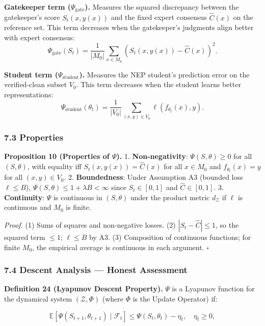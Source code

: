 \documentclass[
  12pt,
]{ctexart}
\begin{document}
\textbf{Gatekeeper term (\(\Psi_{\text{gate}}\)).} Measures the squared
discrepancy between the gatekeeper's score \(S_t(x, y(x))\) and the
fixed expert consensus \(\hat{C}(x)\) on the reference set. This term
decreases when the gatekeeper's judgments align better with expert
consensus:
\[\Psi_{\text{gate}}(S_t) = \frac{1}{|M_0|} \sum_{x \in M_0} (S_t(x, y(x)) - \hat{C}(x))^2.\]

\textbf{Student term (\(\Psi_{\text{student}}\)).} Measures the NEP
student's prediction error on the verified-clean subset \(V_0\). This
term decreases when the student learns better representations:
\[\Psi_{\text{student}}(\theta_t) = \frac{1}{|V_0|} \sum_{(x,y) \in V_0} \ell(f_{\theta_t}(x), y).\]

\subsubsection{7.3 Properties}\label{properties}

\textbf{Proposition 10 (Properties of \(\Psi\)).} 1.
\textbf{Non-negativity}: \(\Psi(S, \theta) \geq 0\) for all
\((S, \theta)\), with equality iff \(S_t(x, y(x)) = \hat{C}(x)\) for all
\(x \in M_0\) and \(f_{\theta_t}(x) = y\) for all \((x,y) \in V_0\). 2.
\textbf{Boundedness}: Under Assumption A3 (bounded loss
\(\ell \leq B\)), \(\Psi(S, \theta) \leq 1 + \lambda B < \infty\) since
\(S_t \in [0,1]\) and \(\hat{C} \in [0,1]\). 3. \textbf{Continuity}:
\(\Psi\) is continuous in \((S, \theta)\) under the product metric
\(d_{\mathcal{Z}}\) if \(\ell\) is continuous and \(M_0\) is finite.

\emph{Proof.} (1) Sums of squares and non-negative losses. (2)
\(|S_t - \hat{C}| \leq 1\), so the squared term \(\leq 1\);
\(\ell \leq B\) by A3. (3) Composition of continuous functions; for
finite \(M_0\), the empirical average is continuous in each argument.
\(\square\)

\subsubsection{7.4 Descent Analysis --- Honest
Assessment}\label{descent-analysis-honest-assessment}

\textbf{Definition 24 (Lyapunov Descent Property).} \(\Psi\) is a
Lyapunov function for the dynamical system \((\mathcal{Z}, \Phi)\)
(where \(\Phi\) is the Update Operator) if:

\[\mathbb{E}[\Psi(S_{t+1}, \theta_{t+1}) \mid \mathcal{F}_t] \leq \Psi(S_t, \theta_t) - \eta_t, \quad \eta_t \geq 0,\]
\end{document}
